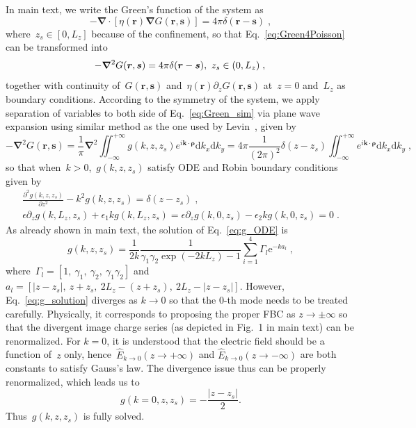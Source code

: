 \documentclass[aps,prl,reprint,showpacs,floatfix,superscriptaddress, onecolumn]{revtex4-2}
\newcommand{\V}[1]{\boldsymbol{#1}} %
\newcommand{\M}[1]{\boldsymbol{#1}} %
\renewcommand{\d}[1]{\delta#1} %
\newcommand{\abs}[1]{\left|#1\right|} %
\newcommand{\grad}{\M{\nabla}} %
\newcommand{\eps}{\epsilon}
\begin{document}
In main text, we write the Green's function of the system as
\begin{equation}
    -\grad\cdot\left[\eta(\V r) \grad G(\V{r},\V{s})\right] = 4 \pi \d(\V r - \V s )\;,\label{eq:Green4Poisson}
\end{equation}
where~$z_s \in [0, L_z]$ because of the confinement, so that Eq.~\eqref{eq:Green4Poisson} can be transformed into
\begin{equation}\label{eq:Green_sim}
    - \grad^2 G(\V{r},\V{s}) = 4 \pi \d(\V r - \V s ),~z_s \in (0, L_z)\;,\\
\end{equation}
together with continuity of~$G(\V r, \V s)$ and~$\eta(\V{r}) \partial_z G(\V r, \V s)$ at~$z = 0$ and~$L_z$ as boundary conditions.
According to the symmetry of the system, we apply separation of variables to both side of Eq.~\eqref{eq:Green_sim} via plane wave expansion using similar method as the one used by Levin~\cite{dos2017simulations}, given by
\begin{equation} \label{eq:single_G}
    - \grad^2 G(\V{r},\V{s}) = \frac{1}{\pi} \grad^2 \iint_{-\infty}^{+\infty} g(k, z, z_s) e^{i \V{k} \cdot \V{\rho}} \text{d}k_x \text{d} k_y = 4 \pi \frac{1}{(2 \pi)^2} \delta(z - z_s) \iint_{-\infty}^{+\infty} e^{i \V{k} \cdot \V{\rho}} \text{d}k_x \text{d} k_y\;,
\end{equation}
so that when~$k > 0$,~$g(k, z, z_s)$ satisfy ODE and Robin boundary conditions given by
    \begin{gather}\label{eq:g_ODE}
        \frac{\partial^2 g(k, z, z_s)}{\partial z ^2} - k^2 g(k, z, z_s) = \delta(z - z_s)\;,\\
        \eps \partial_z g(k, L_z, z_s) + \eps_1 k g(k, L_z, z_s) = \eps \partial_z g(k, 0, z_s) - \eps_2 k g(k, 0, z_s) = 0\;.
    \end{gather}
As already shown in main text, the solution of Eq.~\eqref{eq:g_ODE} is
\begin{equation}\label{eq:g_solution}
    g(k, z, z_s) = \frac{1}{2k} \frac{1}{\gamma_1 \gamma_2 \exp{(-2 k L_z)} - 1} \sum_{i = 1}^{4} \Gamma_l \text{e}^{-k a_l}\;,
\end{equation}
where~$\Gamma_l = \left[1, ~\gamma_1, ~\gamma_2, ~\gamma_1 \gamma_2 \right]$ and~$a_l = [\abs{z - z_s}, ~z + z_s, ~2L_z - (z + z_s), ~2L_z - \abs{z - z_s}]$.
However, Eq.~\eqref{eq:g_solution} diverges as $k\to 0$ so that the 0-th mode needs to be treated carefully.
Physically, it corresponds to proposing the proper FBC as $z\to\pm\infty$ so that the divergent image charge series (as depicted in Fig.~1 in main text) can be renormalized.
For $k = 0$, it is understood that the electric field should be a function of~$z$ only, hence~$\hat E_{k \to 0}(z \to +\infty)$ and $\hat E_{k \to 0}(z \to -\infty)$ are both constants to satisfy Gauss's law.
The divergence issue thus can be properly renormalized, which leads us to
\begin{equation}\label{eq:g_k=0}
    g(k = 0, z, z_s) = - \frac{\abs{z - z_s}}{2}.
\end{equation}
Thus~$g(k, z, z_s)$ is fully solved.
\end{document}
